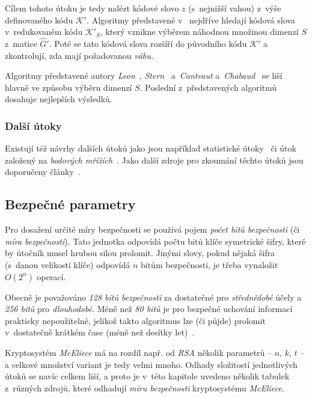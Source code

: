 \documentclass[thesis=M,czech,hidelinks]{FITthesis}[2012/06/26]
\newcommand{\0}{{\textcolor[gray]{0.80}{0}}}
\begin{document}
Cílem tohoto útoku je tedy nalézt kódové slovo $z$ (s~nejnižší vahou) z~výše
definovaného kódu $\mathcal{K}'$. Algoritmy představené
v~\cite{Leon,Stern,Canteaut} nejdříve hledají kódová slova v~redukovaném kódu
$\mathcal{K}'_S$, který vznikne výběrem náhodnou množinou dimenzí $S$ z~matice
$\hat{G}'$. Poté se tato kódová slova rozšíří do původního kódu $\mathcal{K}'$ a
zkontrolují, zda mají požadovanou \emph{váhu}.


Algoritmy představené autory \emph{Leon}~\cite{Leon}, \emph{Stern}~\cite{Stern}
a~\emph{Canteaut} a~\emph{Chabaud}~\cite{Canteaut} se liší hlavně ve způsobu
výběru dimenzí $S$. Poslední z~představených algoritmů dosahuje nejlepších
výsledků.


\subsubsection{Další útoky}

Existují též návrhy dalších útoků jako jsou například statistické
útoky~\cite{Jabri} či útok založený na \emph{bodových mřížích}~\cite{Brickell}.
Jako další zdroje pro zkoumání těchto útoků jsou doporučeny
články~\cite{Repka,Engelbert}.



\subsection{Bezpečné parametry}\label{kap_bezpecne_parametry}

Pro dosažení určité míry bezpečnosti se používá pojem \emph{počet bitů
bezpečnosti} (či \emph{míra bezpečnosti}). Tato jednotka odpovídá počtu bitů
klíče symetrické šifry, které by útočník musel hrubou silou prolomit. Jinými
slovy, pokud nějaká šifra (s~danou velikostí klíče) odpovídá $n$ bitům
bezpečnosti, je třeba vynaložit $O\left(2^n\right)$ operací.

Obecně je považováno \emph{128 bitů bezpečnosti} za dostatečné pro
\emph{střednědobé} účely a \emph{256 bitů} pro \emph{dlouhodobé}. Méně než
\emph{80 bitů} je pro bezpečné uchování informací prakticky nepoužitelné,
jelikož takto  algoritmus lze (či půjde) prolomit v~dostatečně krátkém
čase (méně než desítky let)~\cite{Paar}.

Kryptosystém \emph{McEliece} má na rozdíl např. od \emph{RSA} několik parametrů
-- $n$, $k$, $t$ -- a celkové množství variant je tedy velmi mnoho.  Odhady
složitostí jednotlivých útoků se navíc celkem liší, a proto je v~této kapitole
uvedeno několik tabulek z~různých zdrojů, které odhadují \emph{míru bezpečnosti}
kryptosystému \emph{McEliece}.
\end{document}
